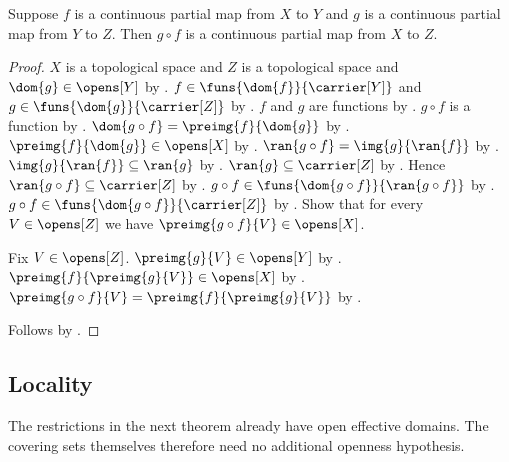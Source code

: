 \begin{theorem}\label{continuous_partial_map_composition}
    Suppose $f$ is a continuous partial map from $X$ to $Y$ and
        $g$ is a continuous partial map from $Y$ to $Z$.
    Then $g\circ f$ is a continuous partial map from $X$ to $Z$.
\end{theorem}
\begin{proof}
    $X$ is a topological space and $Z$ is a topological space and
        $\dom{g}\in\opens[Y]$ by .
    $f\in\funs{\dom{f}}{\carrier[Y]}$ and
        $g\in\funs{\dom{g}}{\carrier[Z]}$ by
        .
    $f$ and $g$ are functions by .
    $g\circ f$ is a function by .
    $\dom{g\circ f}=\preimg{f}{\dom{g}}$ by .
    $\preimg{f}{\dom{g}}\in\opens[X]$ by
        .
    $\ran{g\circ f}=\img{g}{\ran{f}}$ by .
    $\img{g}{\ran{f}}\subseteq\ran{g}$ by .
    $\ran{g}\subseteq\carrier[Z]$ by .
    Hence $\ran{g\circ f}\subseteq\carrier[Z]$ by .
    $g\circ f\in\funs{\dom{g\circ f}}{\ran{g\circ f}}$ by
        .
    $g\circ f\in\funs{\dom{g\circ f}}{\carrier[Z]}$ by .
    Show that for every $V\in\opens[Z]$ we have $\preimg{g\circ f}{V}\in\opens[X]$.
    \begin{subproof}
        Fix $V\in\opens[Z]$.
        $\preimg{g}{V}\in\opens[Y]$ by .
        $\preimg{f}{\preimg{g}{V}}\in\opens[X]$ by
            .
        $\preimg{g\circ f}{V}=\preimg{f}{\preimg{g}{V}}$ by .
    \end{subproof}
    Follows by .
\end{proof}

\subsection{Locality}

The restrictions in the next theorem already have open effective domains.
The covering sets themselves therefore need no additional openness hypothesis.

